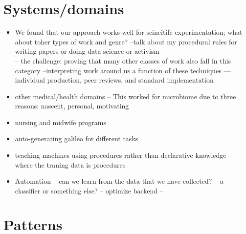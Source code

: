 \section{Systems/domains} 

\begin{itemize}
\item We found that our approach works well for scineitifc experimentation; what about toher types of work and genre?
--talk about my procedural rules for writing papers or doing data science or activism \\
-- the challenge: proving that many other classes of work also fall in this category
--interpreting work around us a function of these techniques — individual production, peer reviews, and standard implementation
\item other medical/health domains -- This worked for microbiome due to three reasons: nascent, personal, motivating 
\item nursing and midwife programs
\item auto-generating galileo for different tasks
\item teaching machines using procedures rather than declarative knowledge -- where the traning data is procedures
\item Automation -- can we learn from the data that we have collected? -- a classifier or something else? -- optimize backend -- 
\end{itemize}



\section{Patterns} 
